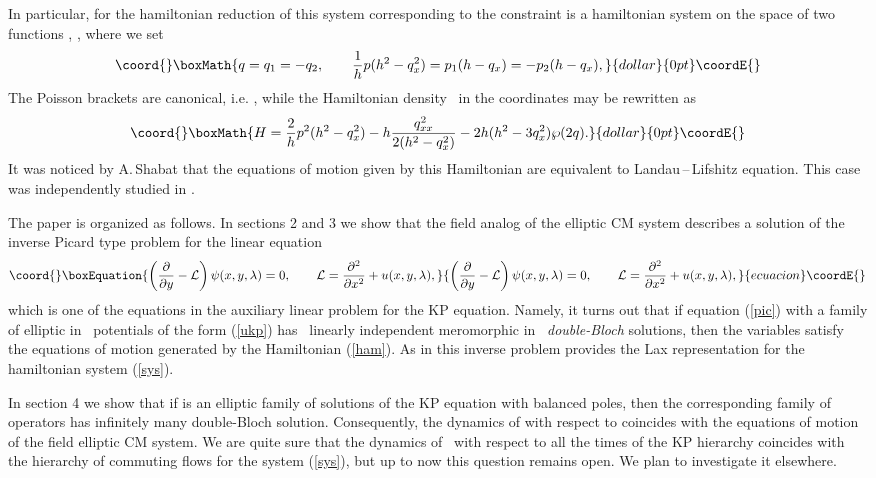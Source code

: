 \documentclass[a4paper,11pt]{article}
\providecommand{\p}{\partial}
\providecommand{\cL}{{\cal L}}
\theoremstyle{plain}
\theoremstyle{remark}
\begin{document}
In particular, for \coordHE{} the hamiltonian reduction of this system
corresponding to the constraint \coordHE{} is a hamiltonian system
on the space of two functions \coordHE{}, \coordHE{}, where we set
$$\coord{}\boxMath{
q=q_1=-q_2,\qquad \frac{1}{h}p(h^2-q_x^2)=p_1(h-q_x)=-p_2(h-q_x),
}{dollar}{0pt}\coordE{}$$
The Poisson brackets are canonical, i.e.
\coordHE{},
while the Hamiltonian density~\coordHE{} in the coordinates \coordHE{} may be
rewritten as
$$\coord{}\boxMath{
H=\frac{2}{h}p^2(h^2-q_x^2)-h\frac{q^2_{xx}}{2(h^2-q_x^2)}-
2h(h^2-3q_x^2)\wp(2q).
}{dollar}{0pt}\coordE{}$$
It was noticed by A.\,Shabat that the equations of motion given by
this Hamiltonian are equivalent to Landau\,--\,Lifshitz equation.
This case \coordHE{} was independently studied in \cite{loz}.

The paper is organized as follows.
In sections 2 and 3 we show that the field analog of the elliptic CM system
describes a solution of the inverse Picard type problem for the linear equation
\begin{equation}\coord{}\boxEquation{\label{pic}
\left(\frac{\p}{\p y}-\cL\right)\psi(x,y,\lambda)=0, \qquad
\cL=\frac{\p^2}{\p x^2}+u(x,y,\lambda),
}{\left(\frac{\p}{\p y}-\cL\right)\psi(x,y,\lambda)=0, \qquad
\cL=\frac{\p^2}{\p x^2}+u(x,y,\lambda),
}{ecuacion}\coordE{}\end{equation}
which is one of the equations in the auxiliary linear problem for
the KP equation.  Namely, it turns out that if equation (\ref{pic}) with
a family of elliptic in~\myHighlight{$\lambda$}\coordHE{} potentials of the form (\ref{ukp})
has~\coordHE{} linearly independent meromorphic in~\myHighlight{$\lambda$}\coordHE{} {\it double-Bloch}
solutions, then the variables \coordHE{} satisfy the equations
of motion generated by the Hamiltonian (\ref{ham}).
As in \cite{krelkp} this inverse problem provides the Lax representation
for the hamiltonian system (\ref{sys}).

In section 4 we show that if \coordHE{} is an elliptic family of
solutions of the KP equation with balanced poles, then the corresponding
family of operators \myHighlight{$\p/\p y-\cL$}\coordHE{} has infinitely many double-Bloch solution.
Consequently, the dynamics of \coordHE{} with respect to \coordHE{}
coincides with the equations of motion of the field elliptic CM system.
We are quite sure that the dynamics of~\coordHE{} with respect to all the times
of the KP hierarchy coincides with the hierarchy of commuting flows
for the system (\ref{sys}), but up to now this question remains open.
We plan to investigate it elsewhere.
\end{document}
